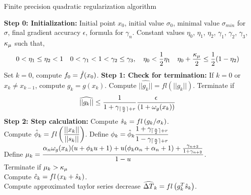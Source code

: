 \documentclass{article}[12pt]
\DeclarePairedDelimiter{\ceil}{\lceil}{\rceil}
\begin{document}

	
	\begin{algorithm}
		\caption{Finite precision quadratic regularization algorithm}
		\label{alg:qrfp}
		
		\begin{algorithmic}
			\State \textbf{Step 0: Initialization:} Initial point $x_0$, initial value $\sigma_0$, minimal value $\sigma_{min}$ for $\sigma$, final gradient accuracy $\epsilon$, formula for $\gamma_n$. Constant values $\eta_0$, $\eta_1$, $\eta_2$, $\gamma_1$, $\gamma_2$, $\gamma_3$, $\kappa_\mu$ such that,
			\begin{equation}
				\label{eq:param_cond}
				0<\eta_1\leq \eta_2<1\quad 0<\gamma_1<1<  \gamma_2 \leq \gamma_3, \quad \eta_0<\frac{1}{2}\eta_1 \quad \eta_0+\dfrac{\kappa_\mu}{2} \leq \frac{1}{2}(1-\eta_2)
			\end{equation}
			Set $k=0$, compute $f_0 = \hat{f}(x_0)$.
			\State \textbf{Step 1: Check for termination:} If $k = 0$ or $x_k \neq x_{k-1}$, compute $g_k = g(x_k)$. Compute $\widehat{||g_k||} = fl(||g_k||)$. Terminate if \begin{equation}
				\label{eq:stop_crit}
				\widehat{||g_k||} \leq \dfrac{1}{1+\gamma_{\ceil{\frac{n}{2}}+r}}\dfrac{\epsilon}{(1+\eg(x_k))}
			\end{equation}
			\State \textbf{Step 2: Step calculation: } Compute $\hat{s}_{k} = fl\left(g_k/\sigma_k\right)$.\\
			Compute $\hat{\phi}_k = fl\left(\dfrac{||x_k||}{||s_k||}\right)$. 
			Define $\phi_k = \hat{\phi}_k\dfrac{1+\gamma_{\ceil{\frac{n}{2}}+r}}{1-\gamma_{\ceil{\frac{n}{2}}+r}}$\\
			Define $\mu_k = \dfrac{\alpha_n \omega_g(x_k)(u+\phi_k u+1) + u(\phi_k\alpha_n+\alpha_n+1) + \frac{\gamma_{n+2}}{1+\gamma_{n+2}}}{1-u}$.\\
			Terminate if $\mu_k > \kappa_\mu$ \\
			Compute $\hat{c}_k = fl\left(x_k+\hat{s}_{k}\right)$.\\
			Compute approximated taylor series decrease $\widehat{\Delta T}_k = fl\left(g_k^T\hat{s}_{k}\right)$.\\
			

\end{algorithmic}
\end{algorithm}
\end{document}
